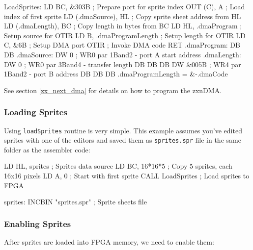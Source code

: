 \begin{tcblisting}{}
LoadSprites:
	LD BC, &303B            ; Prepare port for sprite index
	OUT (C), A              ; Load index of first sprite
	LD (.dmaSource), HL     ; Copy sprite sheet address from HL
	LD (.dmaLength), BC     ; Copy length in bytes from BC
	LD HL, .dmaProgram      ; Setup source for OTIR
	LD B, .dmaProgramLength ; Setup length for OTIR
	LD C, &6B               ; Setup DMA port
	OTIR                    ; Invoke DMA code
	RET
.dmaProgram:
	DB %
	DB %
.dmaSource:
	DW 0                    ; WR0 par 1Band2 - port A start address
.dmaLength:
	DW 0                    ; WR0 par 3Band4 - transfer length
	DB %
	DB %
	DB %
	DW &005B                ; WR4 par 1Band2 - port B address
	DB %
	DB %
	DB %
.dmaProgramLength = &-.dmaCode
\end{tcblisting}

See section \ref{zx_next_dma} for details on how to program the zxnDMA.


\pagebreak
\subsubsection{Loading Sprites}

Using {\tt loadSprites} routine is very simple. This example assumes you've edited sprites with one of the editors and saved them as {\tt sprites.spr} file in the same folder as the assembler code:

\begin{tcblisting}{}
	LD HL, sprites          ; Sprites data source
	LD BC, 16*16*5          ; Copy 5 sprites, each 16x16 pixels
	LD A, 0                 ; Start with first sprite
	CALL LoadSprites        ; Load sprites to FPGA

sprites:
	INCBIN "sprites.spr"    ; Sprite sheets file
\end{tcblisting}


\subsubsection{Enabling Sprites}

After sprites are loaded into FPGA memory, we need to enable them:


